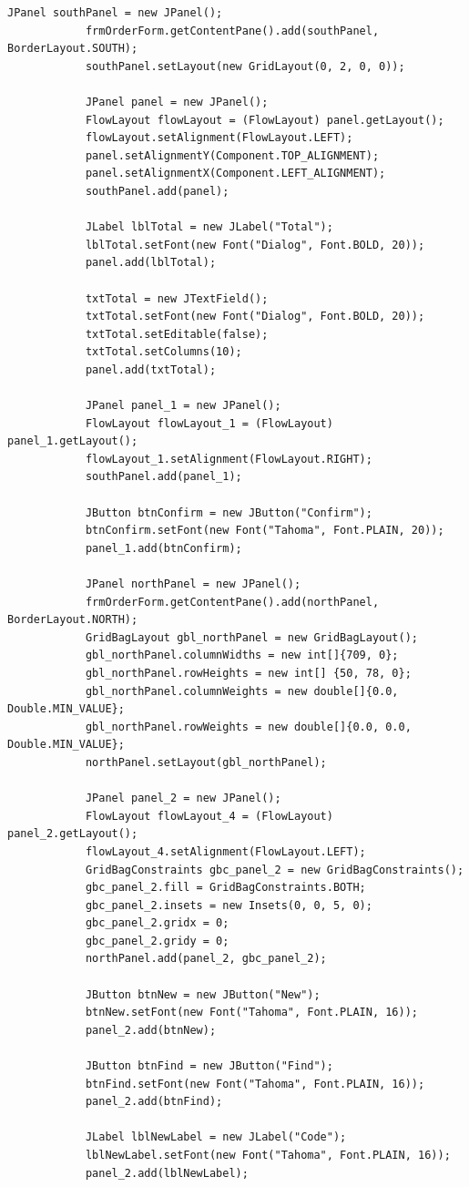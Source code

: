 \begin{lstlisting}[style=JavaStyle]
			JPanel southPanel = new JPanel();
			frmOrderForm.getContentPane().add(southPanel, BorderLayout.SOUTH);
			southPanel.setLayout(new GridLayout(0, 2, 0, 0));
			
			JPanel panel = new JPanel();
			FlowLayout flowLayout = (FlowLayout) panel.getLayout();
			flowLayout.setAlignment(FlowLayout.LEFT);
			panel.setAlignmentY(Component.TOP_ALIGNMENT);
			panel.setAlignmentX(Component.LEFT_ALIGNMENT);
			southPanel.add(panel);
			
			JLabel lblTotal = new JLabel("Total");
			lblTotal.setFont(new Font("Dialog", Font.BOLD, 20));
			panel.add(lblTotal);
			
			txtTotal = new JTextField();
			txtTotal.setFont(new Font("Dialog", Font.BOLD, 20));
			txtTotal.setEditable(false);
			txtTotal.setColumns(10);
			panel.add(txtTotal);
			
			JPanel panel_1 = new JPanel();
			FlowLayout flowLayout_1 = (FlowLayout) panel_1.getLayout();
			flowLayout_1.setAlignment(FlowLayout.RIGHT);
			southPanel.add(panel_1);
			
			JButton btnConfirm = new JButton("Confirm");
			btnConfirm.setFont(new Font("Tahoma", Font.PLAIN, 20));
			panel_1.add(btnConfirm);
			
			JPanel northPanel = new JPanel();
			frmOrderForm.getContentPane().add(northPanel, BorderLayout.NORTH);
			GridBagLayout gbl_northPanel = new GridBagLayout();
			gbl_northPanel.columnWidths = new int[]{709, 0};
			gbl_northPanel.rowHeights = new int[] {50, 78, 0};
			gbl_northPanel.columnWeights = new double[]{0.0, Double.MIN_VALUE};
			gbl_northPanel.rowWeights = new double[]{0.0, 0.0, Double.MIN_VALUE};
			northPanel.setLayout(gbl_northPanel);
			
			JPanel panel_2 = new JPanel();
			FlowLayout flowLayout_4 = (FlowLayout) panel_2.getLayout();
			flowLayout_4.setAlignment(FlowLayout.LEFT);
			GridBagConstraints gbc_panel_2 = new GridBagConstraints();
			gbc_panel_2.fill = GridBagConstraints.BOTH;
			gbc_panel_2.insets = new Insets(0, 0, 5, 0);
			gbc_panel_2.gridx = 0;
			gbc_panel_2.gridy = 0;
			northPanel.add(panel_2, gbc_panel_2);
			
			JButton btnNew = new JButton("New");
			btnNew.setFont(new Font("Tahoma", Font.PLAIN, 16));
			panel_2.add(btnNew);
			
			JButton btnFind = new JButton("Find");
			btnFind.setFont(new Font("Tahoma", Font.PLAIN, 16));
			panel_2.add(btnFind);
			
			JLabel lblNewLabel = new JLabel("Code");
			lblNewLabel.setFont(new Font("Tahoma", Font.PLAIN, 16));
			panel_2.add(lblNewLabel);
			

\end{lstlisting}
